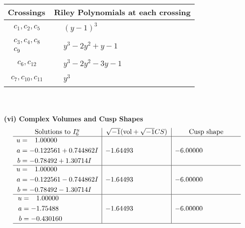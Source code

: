 \documentclass[1p]{elsarticle_modified}
\theoremstyle{definition}
\newcommand{\I}{\sqrt{-1}}
\begin{document}
\begin{tabular}{m{50pt}|m{274pt}}
Crossings & \hspace{64pt}Riley Polynomials at each crossing \\
\hline $$\begin{aligned}c_{1},c_{2},c_{5}\end{aligned}$$&$\begin{aligned}
&(y-1)^3
\end{aligned}$\\
\hline $$\begin{aligned}c_{3},c_{4},c_{8}\\c_{9}\end{aligned}$$&$\begin{aligned}
&y^3-2 y^2+y-1
\end{aligned}$\\
\hline $$\begin{aligned}c_{6},c_{12}\end{aligned}$$&$\begin{aligned}
&y^3-2 y^2-3 y-1
\end{aligned}$\\
\hline $$\begin{aligned}c_{7},c_{10},c_{11}\end{aligned}$$&$\begin{aligned}
&y^3
\end{aligned}$\\
\hline
\end{tabular}\\~\\
\newpage\flushleft \textbf{(vi) Complex Volumes and Cusp Shapes}
$$\begin{array}{c|c|c}  
\text{Solutions to }I^u_{6}& \I (\text{vol} + \sqrt{-1}CS) & \text{Cusp shape}\\
 \hline 
\begin{aligned}
u &= \phantom{-}1.00000\phantom{ +0.000000I} \\
a &= -0.122561 + 0.744862 I \\
b &= -0.78492 + 1.30714 I\end{aligned}
 & -1.64493\phantom{ +0.000000I} & -6.00000\phantom{ +0.000000I} \\ \hline\begin{aligned}
u &= \phantom{-}1.00000\phantom{ +0.000000I} \\
a &= -0.122561 - 0.744862 I \\
b &= -0.78492 - 1.30714 I\end{aligned}
 & -1.64493\phantom{ +0.000000I} & -6.00000\phantom{ +0.000000I} \\ \hline\begin{aligned}
u &= \phantom{-}1.00000\phantom{ +0.000000I} \\
a &= -1.75488\phantom{ +0.000000I} \\
b &= -0.430160\phantom{ +0.000000I}\end{aligned}
 & -1.64493\phantom{ +0.000000I} & -6.00000\phantom{ +0.000000I}\\
 \hline 
 \end{array}$$\newpage\newpage\renewcommand{\arraystretch}{1}
\end{document}
